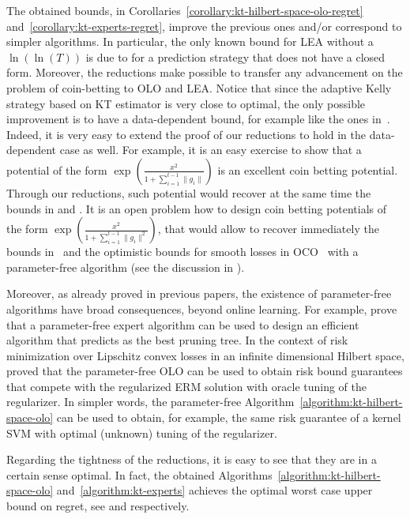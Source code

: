 The obtained bounds, in Corollaries~\ref{corollary:kt-hilbert-space-olo-regret}
and~\ref{corollary:kt-experts-regret}, improve the previous ones and/or
correspond to simpler algorithms.  In particular, the only known bound for
\ac{LEA} without a $\ln(\ln(T))$ is due to \citet{ChernovV10} for a prediction
strategy that does not have a closed form.  Moreover, the reductions make
possible to transfer any advancement on the problem of coin-betting to \ac{OLO}
and \ac{LEA}. Notice that since the adaptive Kelly strategy based on \ac{KT}
estimator is very close to optimal, the only possible improvement is to have a
data-dependent bound, for example like the ones in~\cite{KoolenE15}. Indeed, it
is very easy to extend the proof of our reductions to hold in the
data-dependent case as well. For example, it is an easy exercise to show that a
potential of the form $\exp \left(\frac{x^2}{1+\sum_{i=1}^{t-1}
\|g_{i}\|}\right)$ is an excellent coin betting potential. Through our
reductions, such potential would recover at the same time the bounds in
\citet{LuoS15} and \citet{Orabona14}. It is an open problem how to design coin
betting potentials of the form $\exp \left(\frac{x^2}{1+\sum_{i=1}^{t-1}
\|g_{i}\|^2}\right)$, that would allow to recover immediately the bounds
in~\citet{KoolenE15} and the optimistic bounds for smooth losses in
\ac{OCO}~\citep{SrebroST10} with a parameter-free algorithm (see the discussion
in \citet{Orabona14}).

Moreover, as already proved in previous papers, the existence of parameter-free
algorithms have broad consequences, beyond online learning. For example,
\citet{LuoS15} prove that a parameter-free expert algorithm can be used to
design an efficient algorithm that predicts as the best pruning tree. In the
context of risk minimization over Lipschitz convex losses in an infinite
dimensional Hilbert space, \citet{Orabona14} proved that the parameter-free
\ac{OLO} can be used to obtain risk bound guarantees that compete with the
regularized \acl{ERM} solution with oracle tuning of the regularizer. In
simpler words, the parameter-free
Algorithm~\ref{algorithm:kt-hilbert-space-olo} can be used to obtain, for
example, the same risk guarantee of a kernel \acl{SVM} with optimal (unknown)
tuning of the regularizer.

Regarding the tightness of the reductions, it is easy to see that they are in a
certain sense optimal. In fact, the obtained
Algorithms~\ref{algorithm:kt-hilbert-space-olo} and~\ref{algorithm:kt-experts}
achieves the optimal worst case upper bound on regret, see \citet{Orabona13}
and \citet{Cesa-BianchiL06} respectively.
